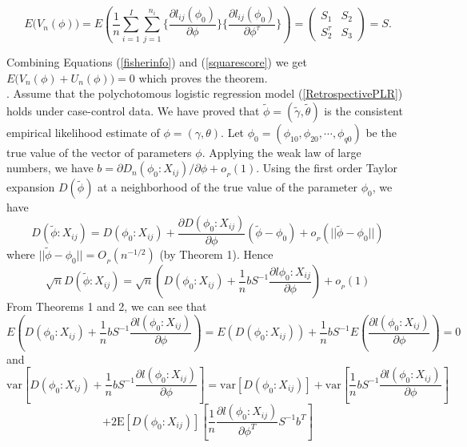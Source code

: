 \documentclass[11pt]{article}
\theoremstyle{plain}
\theoremstyle{definition}
\theoremstyle{remark}
\theoremstyle{definition}
\begin{document}
\begin{equation}
E\Big(V_n(\phi)\Big)=E\left(\frac{1}{n}\sum_{i=1}^I\sum_{j=1}^{n_i}
\{\frac{\partial l_{ij}(\phi_0)}{\partial\phi}\} \{\frac{\partial
l_{ij}(\phi_0)}{\partial\phi^\tau}
\}\right)=\left(\begin{array}{cc} S_1 & S_2 \\ S_2^\tau & S_3
\end{array} \right)=S.
\label{squarescore}
\end{equation}

\noindent Combining Equations (\ref{fisherinfo}) and (\ref{squarescore})
we get $E\Big(V_n(\phi)+U_n(\phi)\Big)=0$ which proves the theorem.\\


. Assume that the polychotomous logistic regression model (\ref{RetrospectivePLR}) holds under case-control data. We have proved that $\tilde{\phi}=(\tilde{\gamma},\tilde{\theta})$ is the
consistent empirical likelihood estimate of $\phi=(\gamma, \theta)$. Let $\phi_0=(\phi_{10}, \phi_{20}, \cdots, \phi_{q0})$ be the true value of the vector of parameters $\phi$. Applying the weak law of large numbers, we have $b =\partial D_n(\phi_0: X_{ij})/\partial \phi + o_{_P}(1)$. Using the first order Taylor expansion $D(\tilde{\phi})$
at a neighborhood of the true value of the parameter $\phi_0$, we have
\begin{equation}
D(\tilde{\phi}:X_{ij})= D(\phi_0:X_{ij})+\frac{\partial D(\phi_0: X_{ij})}{\partial \phi}(\tilde{\phi}-\phi_0)+o_{_P}(||\tilde{\phi}-\phi_0||)
\end{equation}
\noindent where $||\tilde{\phi}-\phi_0||=O_{_P}(n^{-1/2})$ (by Theorem 1). Hence
\begin{equation}
\sqrt{n}D(\tilde{\phi}:X_{ij})= \sqrt{n}\left(D(\phi_0:X_{ij})+ \frac{1}{n}bS^{-1}\frac{\partial l{\phi_0: X_{ij}}}{\partial \phi}\right)+o_{_P}(1)
\end{equation}
From Theorems 1 and 2, we can see that
$$
E\left(D(\phi_0:X_{ij})+ \frac{1}{n}bS^{-1}\frac{\partial l(\phi_0: X_{ij})}{\partial \phi}\right)
=E\left(D(\phi_0:X_{ij})\right)+ \frac{1}{n}bS^{-1}E\left(\frac{\partial l(\phi_0: X_{ij})}{\partial \phi}\right) =0
$$
and
$$
\mbox{var}\left[ D(\phi_0:X_{ij})+ \frac{1}{n}bS^{-1}\frac{\partial l(\phi_0: X_{ij})}{\partial \phi}\right]
=\mbox{var} \left[ D(\phi_0:X_{ij})\right] + \mbox{var}\left[ \frac{1}{n}bS^{-1}\frac{\partial l(\phi_0: X_{ij})}{\partial \phi}\right]
$$
\begin{equation}
+ 2 \mbox{E}\left[ D(\phi_0:X_{ij})\right]\left[\frac{1}{n}\frac{\partial l(\phi_0: X_{ij})}{\partial \phi^T}S^{-1}b^T \right]
\end{equation}
\end{document}
